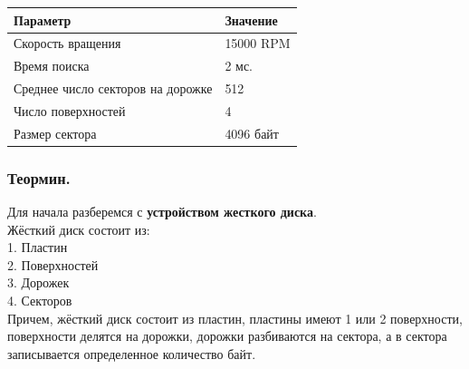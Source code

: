 \documentclass[12pt, letterpaper]{article}
\begin{document}
\begin{tabular}{|l|l|}
    \hline
    \textbf{Параметр} & \textbf{Значение}\\
    \hline
    Скорость вращения & 15000 RPM\\
    \hline
    Время поиска & 2 мс.\\
    \hline
    Среднее число секторов на дорожке & 512\\
    \hline
    Число поверхностей & 4\\
    \hline
    Размер сектора & 4096 байт\\
    \hline
\end{tabular}
\vspace{2cm}
\subsubsection{Теормин.}
Для начала разберемся с \textbf{устройством жесткого диска}.\\
Жёсткий диск состоит из:\\
1. Пластин\\
2. Поверхностей\\
3. Дорожек\\
4. Секторов\\
Причем, жёсткий диск состоит из пластин, пластины имеют 1 или 2 поверхности, поверхности делятся на дорожки, дорожки разбиваются на сектора, а в сектора записывается определенное количество байт.\\
\end{document}
